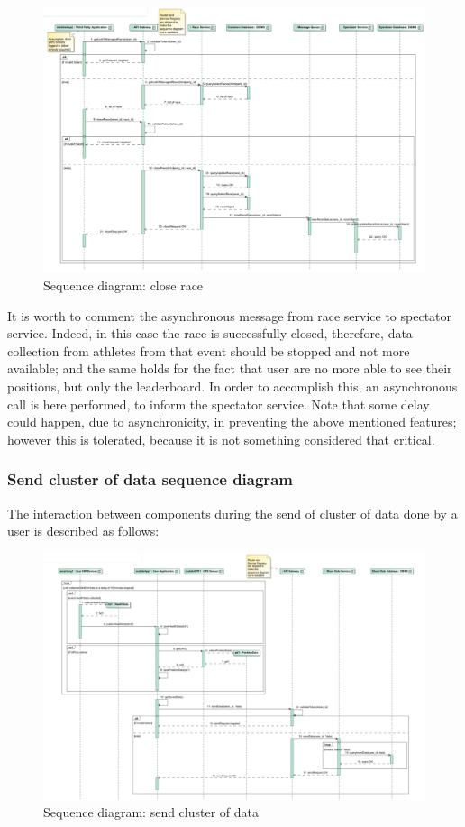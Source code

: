 \begin{figure}[H]
\includegraphics[width=\linewidth]{Images/closerace.pdf}
\caption{ Sequence diagram: close race}
\label{fig:closerace}
\end{figure}

It is worth to comment the asynchronous message from race service to spectator service. 
Indeed, in this case the race is successfully closed, therefore, data collection from athletes from that event should be stopped and not 
more available; and the same holds for the fact that user are no more able to see their positions, but only the leaderboard.
In order to accomplish this, an asynchronous call is here performed, to inform the spectator service. 
Note that some delay could happen, due to asynchronicity, in preventing the above mentioned features; however this is tolerated, because
it is not something considered that critical.

\subsubsection{Send cluster of data sequence diagram}
The interaction between components during the send of cluster of data done by a user is described as follows:

\begin{figure}[H]
\includegraphics[width=\linewidth]{Images/senddata.pdf}
\caption{ Sequence diagram: send cluster of data}
\label{fig:closerace}
\end{figure}

